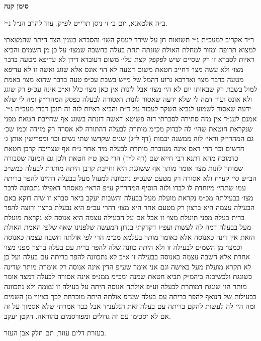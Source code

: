 \documentclass[12pt, openany]{book}
\newcommand{\chapname}{}
\newcommand{\newchap}[1]{
	\addcontentsline{toc}{chapter}{#1}
	\renewcommand{\chapname}{#1}
		\begin{center}
			\textbf{%
\fontsize{16pt}{16pt}\selectfont
				#1}
		\end{center}
}
\begin{document}
\newchap{סימן קנה}
\begin{multicols}{2}
ב״ה אלטאנא, יום ב׳ ז׳ ניסן תרי״ט לפ״ק. עוד להרב הנ״ל נ״י.\\\vspace{0pt}

ר״ד אקריב למעכ״ת נ״י תשואות חן על שירד לעמק השו׳ והסברא בענין הצד היתר שהמצאתי למצוא תרופה ומזור למחלת האולת שזנתה תחת בעלה בחשבה שמצו׳ על כן מן השמים והביא ראיות לסברא זו רק שסיים שיש לפקפק קצת עלי׳ משום דעובדא דידן לא עדיפא מטעה בדבר מצו׳ ולא עשה מצו׳ דחייב חטאת משום דטעה לא הוי אונס אלא שוגג ואשה זו לא עדיפא מטעה בדבר מצו׳ ואדרבא גרוע דהמל של מ״ש בשבת עכ״פ טעה בדבר שהוא מצו׳ באמת למול בשבת רק שבאותו יום לא הי׳ מצו׳ אבל לזנות אין כאן מצו׳ כלל וא״כ אינה עכ״פ רק שוגג ולא אונס ועוד דמה לי שלא ידעה שאסור לזנות דאסורה לבעלה כפסק המהרי״ק ומה לי שלא ידעה שאסור לשמוע לנביא השקר לעבור על ד״ת והביא ראיות לזה זה תוכן דברי מעכ״ת נ״י. אמנם לענ״ד אין מזה סתירה לסברתי דזה פשיטא דאשה דזנתה בשוגג אף שחייבת חטאת מפני שנקראת חוטאת שהי׳ לה לבדוק מכ״מ מותרת לבעלה דהתורה לא אסרה רק מזידה וכמו שכ׳ גם המהרי״ק וראי׳ לזה ממשנה יבמות (דף ל״ג) שנים שקדשו שתי נשים וכו׳ ומפרישין אותן ג׳ חדשים וכו׳ הרי דאם אינה מעוברת מותרת לבעלה מיד אחר ג״ח אף שצריכה קרבן חטאת כדמוכח מהא דתנא רבי חייא שם (דף ל״ד) הרי כאן ט״ז חטאת ולכן גם המזנה שסבורה שמותר לזנות מצד אומר מותר אף ששוגגת היא וחייבת קרבן היתה מותרת לבעלה כמש״כ הב״ש סי׳ קע״ח ולא אסורה רק מטעם שעכ״פ נתכוונה למעול מעל בבעלה דהיינו להפר בריתה עמו שתהי׳ מיוחדת לו לבדו ולזה הוסיף המהרי״ק ע״פ הראי׳ מאסתר דאפילו נתכוונה לדבר מצו׳ בבעילתה מכ״מ נקראת מועלת מעל בבעלה והשבות יעקב ביאר סברא זו שזה דוקא באם הבעילה עצמה היא ברצון רק מטעם אחר היא מצו׳ דהרי עכ״פ היא נבעלת ברצון ורוצה להפר ברית בעלה מפני תועלת מצו׳ זו אבל אם על הבעילה עצמה היא אנוסה לא נקראת מועלת מעל בבעלה דמה לה לעשות ועפ״ז דקדקתי בנדון המעשה שלפנינו שאף שלפי האמת האולת הזאת אין דינה כאנוסה אלא כאומר מותר בעלמא מכ״מ הרי לפי אולתה חשבה עצמה כאנוסה וכמצו׳ מן השמים לבעילה זו ולא היתה כוונה שלה להפר ברית עם בעלה ברצון מפני מצו׳ אחרת אלא חשבה עצמה כאנוסה בבעילה זו א״כ לא נתכוונה להפר בריתה עם בעלה ועל כן לא תקרא מועלת מעל באישה וגם אני אומר שע״פ הדין אינה אנוסה רק אומרת מותר שדינה כשוגגת ולכשיבנה ביהמ״ק תביא חטאת שמנה ומכ״מ ממנ״פ אינה אסורה לבעלה דמצד אומר מותר הוי שוגגת דמותרת לבעלה וע״פ אולתה אנוסה היתה על בעילה זו עצמה ולא נתכוונה בבעילות של הנואף להפר בריתה עם בעלה שע״פ אולתה היתה מוכרחת לכך בציווי מן השמים ומה הי׳ לה לעשות להקם בריתה עם בעלה זאת הנלענ״ד אבל כבר אמרתי שלא אסמוך על זה אם לא יסכימו עם זה גדולים ומפורסמים בהוראה. הקטן יעקב.\\\vspace{0pt}

בעזרת דלים עוזר, תם חלק אבן העזר.\\\vspace{0pt}

\end{multicols}\newpage
\end{document}
